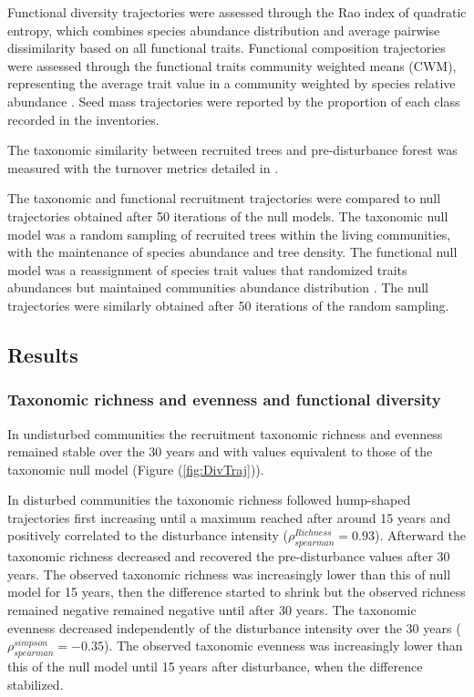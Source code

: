 \documentclass[
  11pt,
  french,
  A4paper,
  extrafontsizes,onecolumn,openright
  ]{memoir}
\begin{document}
Functional diversity trajectories were assessed through the Rao index of
quadratic entropy, which combines species abundance distribution and
average pairwise dissimilarity based on all functional traits.
Functional composition trajectories were assessed through the functional
traits community weighted means (CWM), representing the average trait
value in a community weighted by species relative abundance
\autocite{Diaz2007}. Seed mass trajectories were reported by the
proportion of each class recorded in the inventories.

The taxonomic similarity between recruited trees and pre-disturbance
forest was measured with the turnover metrics detailed in
\textcite{Podani2013}.

The taxonomic and functional recruitment trajectories were compared to
null trajectories obtained after 50 iterations of the null models. The
taxonomic null model was a random sampling of recruited trees within the
living communities, with the maintenance of species abundance and tree
density. The functional null model was a reassignment of species trait
values that randomized traits abundances but maintained communities
abundance distribution \autocite{Mason2013}. The null trajectories were
similarly obtained after 50 iterations of the random sampling.

\subsection{Results}\label{results-2}

\subsubsection{Taxonomic richness and evenness and functional
diversity}\label{taxonomic-richness-and-evenness-and-functional-diversity}

In undisturbed communities the recruitment taxonomic richness and
evenness remained stable over the 30 years and with values equivalent to
those of the taxonomic null model (Figure (\ref{fig:DivTraj})).

In disturbed communities the taxonomic richness followed hump-shaped
trajectories first increasing until a maximum reached after around 15
years and positively correlated to the disturbance intensity
(\(\rho^{Richness}_{spearman}=0.93\)). Afterward the taxonomic richness
decreased and recovered the pre-disturbance values after 30 years. The
observed taxonomic richness was increasingly lower than this of null
model for 15 years, then the difference started to shrink but the
observed richness remained negative remained negative until after 30
years. The taxonomic evenness decreased independently of the disturbance
intensity over the 30 years (\(\rho^{simpson}_{spearman}=-0.35\)). The
observed taxonomic evenness was increasingly lower than this of the null
model until 15 years after disturbance, when the difference stabilized.
\end{document}
